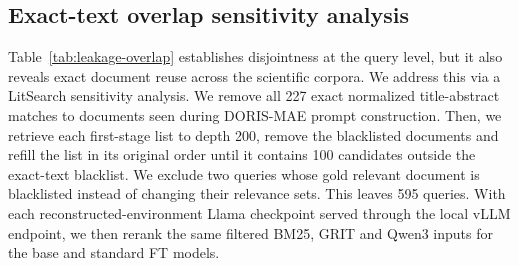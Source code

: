 \documentclass[pdflatex,sn-basic,Numbered]{sn-jnl}%
\theoremstyle{thmstyleone}%
\theoremstyle{thmstyletwo}%
\theoremstyle{thmstylethree}%
\begin{document}
\subsection{Exact-text overlap sensitivity analysis}
\label{sec:document-disjoint}

Table~\ref{tab:leakage-overlap} establishes disjointness at the query level, but it
also reveals exact document reuse across the scientific corpora. We address this
via a LitSearch sensitivity analysis. We remove all 227 exact
normalized title-abstract matches to documents seen during DORIS-MAE prompt
construction. Then, we retrieve each first-stage list to depth 200, remove the
blacklisted documents and refill the list in its original order until it contains
100 candidates outside the exact-text blacklist. We exclude two queries whose gold relevant document is
blacklisted instead of changing their relevance sets. This leaves 595 queries.
With each reconstructed-environment Llama checkpoint served through the local
vLLM endpoint, we then rerank the same filtered BM25,
GRIT and Qwen3 inputs for the base and standard FT models.

\begin{table}[ht]


\centering
\scriptsize
\setlength{\tabcolsep}{2.7pt}
\renewcommand{\arraystretch}{1.08}



\caption{Filtered exact-text overlap LitSearch results for representative reconstructed Llama 3.1 8B. Scores are percentages over the same 595 queries; FT-minus-base differences are in percentage points}
\label{tab:litsearch-document-disjoint}
\end{table}
\end{document}
